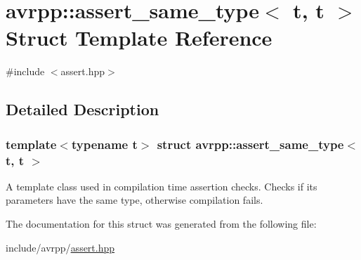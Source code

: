 \hypertarget{structavrpp_1_1assert__same__type_3_01t_00_01t_01_4}{
\section{avrpp::assert\_\-same\_\-type$<$ t, t $>$ Struct Template Reference}
\label{structavrpp_1_1assert__same__type_3_01t_00_01t_01_4}
}


{\ttfamily \#include $<$assert.hpp$>$}



\subsection{Detailed Description}
\subsubsection*{template$<$typename t$>$ struct avrpp::assert\_\-same\_\-type$<$ t, t $>$}

A template class used in compilation time assertion checks. Checks if its parameters have the same type, otherwise compilation fails. 

The documentation for this struct was generated from the following file:\begin{DoxyCompactItemize}
\item 
include/avrpp/\hyperlink{assert_8hpp}{assert.hpp}\end{DoxyCompactItemize}

